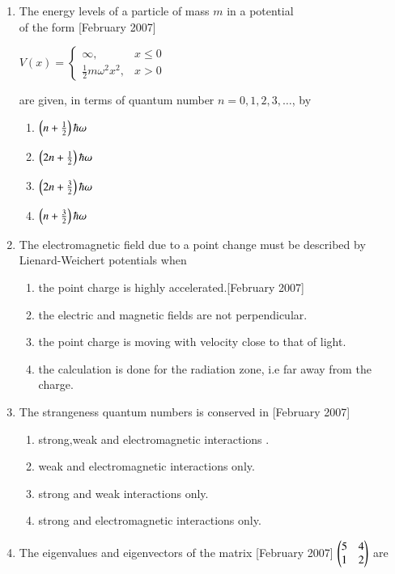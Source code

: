 \documentclass[journal]{IEEEtran}
\begin{document}
\begin{enumerate}
\item  The energy levels of a particle of mass $m$ in a potential \\of the form \hfill[February 2007]

$
V(x) = 
\begin{cases} 
\infty, & x \leq 0 \\
\frac{1}{2} m \omega^2 x^2, & x > 0
\end{cases} $

are given, in terms of quantum number $n = 0, 1, 2, 3, \dots$, by

\begin{enumerate}
\item $ \left(n + \frac{1}{2}\right)\hbar\omega  $
\item $ \left(2n + \frac{1}{2}\right)\hbar\omega  $
\item $ \left(2n + \frac{3}{2}\right)\hbar\omega  $
\item $ \left(n + \frac{3}{2}\right)\hbar\omega $
\end{enumerate}

\item The electromagnetic field due to a point change must be described by Lienard-Weichert potentials when 
\begin{enumerate}
\item  the point charge is highly accelerated.\hfill[February 2007]
\item the electric and magnetic fields are not perpendicular.
\item the point charge is moving with velocity close to that of light.
\item the calculation is done for the radiation zone, i.e far away from the charge.
\end{enumerate}
\item The strangeness quantum numbers is conserved in \hfill[February 2007]
\begin{enumerate}
\item strong,weak and electromagnetic interactions .
    \item weak and electromagnetic interactions only.
    \item strong and weak interactions only.
    \item strong and electromagnetic interactions only.
\end{enumerate}
\item The eigenvalues and eigenvectors of the matrix \hfill[February 2007]  $\begin{pmatrix}
5 & 4 \\
1 & 2
\end{pmatrix}
$
are


\end{enumerate}
\end{document}
